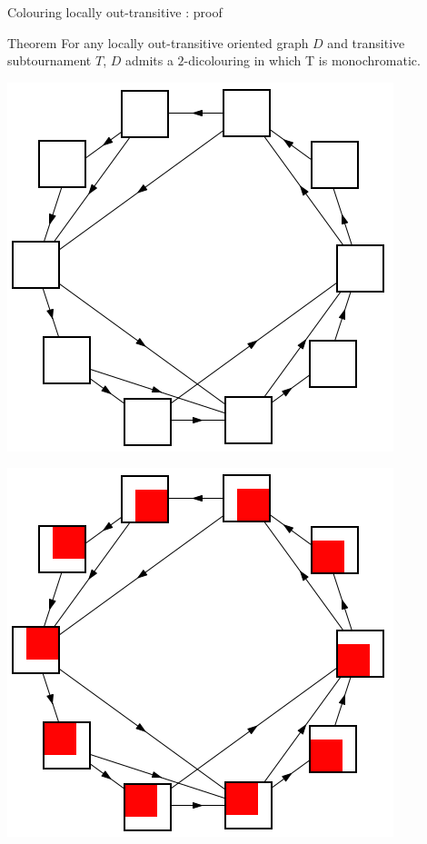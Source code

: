 \documentclass{beamer}
\begin{document}
\begin{frame}{Colouring locally out-transitive : proof}

\begin{block}{Theorem}
For any locally out-transitive oriented graph $D$ and transitive subtournament $T$, $D$ admits a $2$-dicolouring in which T is monochromatic.
\end{block}

 {
\centering
\includegraphics[scale=0.5]{Images/decomposition.png}
}

 {
\centering
\includegraphics[scale=0.5]{Images/decomposition_with_arrivals.png}
}


\end{frame}
\end{document}
